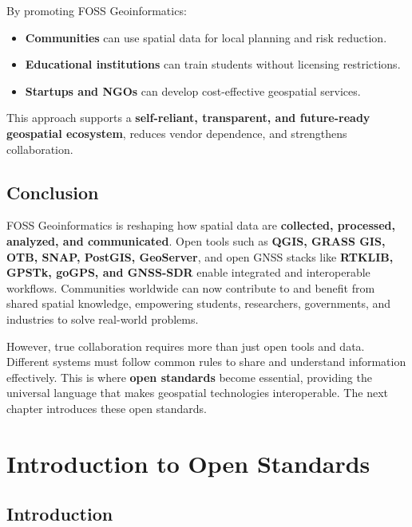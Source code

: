 \documentclass[
  11pt,
  letterpaper,
]{book}
\providecommand{\tightlist}{%
  \setlength{\itemsep}{0pt}\setlength{\parskip}{0pt}}
\begin{document}
By promoting FOSS Geoinformatics:

\begin{itemize}
\tightlist
\item
  \textbf{Communities} can use spatial data for local planning and risk
  reduction.\\
\item
  \textbf{Educational institutions} can train students without licensing
  restrictions.\\
\item
  \textbf{Startups and NGOs} can develop cost-effective geospatial
  services.
\end{itemize}

This approach supports a \textbf{self-reliant, transparent, and
future-ready geospatial ecosystem}, reduces vendor dependence, and
strengthens collaboration.

\section{Conclusion}\label{conclusion-3}

FOSS Geoinformatics is reshaping how spatial data are \textbf{collected,
processed, analyzed, and communicated}. Open tools such as \textbf{QGIS,
GRASS GIS, OTB, SNAP, PostGIS, GeoServer}, and open GNSS stacks like
\textbf{RTKLIB, GPSTk, goGPS, and GNSS-SDR} enable integrated and
interoperable workflows. Communities worldwide can now contribute to and
benefit from shared spatial knowledge, empowering students, researchers,
governments, and industries to solve real-world problems.

However, true collaboration requires more than just open tools and data.
Different systems must follow common rules to share and understand
information effectively. This is where \textbf{open standards} become
essential, providing the universal language that makes geospatial
technologies interoperable. The next chapter introduces these open
standards.

\chapter{Introduction to Open
Standards}\label{introduction-to-open-standards}

\section{Introduction}\label{introduction-1}
\end{document}
